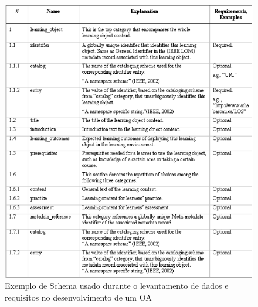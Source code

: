 \documentclass[12pt,openright,oneside,a4paper,english,french,spanish,brazil]{unifil}
\begin{document}
\begin{figure}[htb]
	\centering
	\includegraphics[scale=0.5]{images/Schema.png}
	\caption{Exemplo de Schema usado durante o levantamento de dados e requisitos no desenvolvimento de um OA}
	\label{img:schema}
\end{figure}

\cleardoublepage

\postextual

\end{document}
